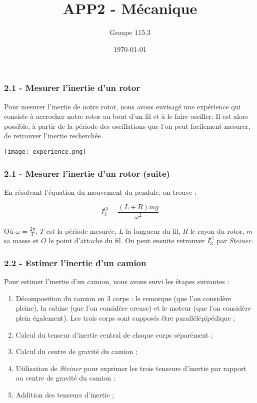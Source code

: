 \documentclass[pdf]{beamer}
\title{APP2 - Mécanique}
\author{Groupe 115.3}
\date{\today}
\begin{document}
\begin{frame}
	\titlepage
\end{frame}
\begin{frame}
	\frametitle{2.1 - Mesurer l'inertie d'un rotor}
	
	Pour mesurer l'inertie de notre rotor, nous avons envisagé une expérience
	qui consiste à accrocher notre rotor au bout d'un fil et à le faire osciller.
	Il est alors possible, à partir de la période des oscillations que l'on peut
	facilement mesurer, de retrouver l'inertie recherchée. 
	
	\begin{center}
		\texttt{[image: experience.png]}
	\end{center}
\end{frame}
\begin{frame}
	\frametitle{2.1 - Mesurer l'inertie d'un rotor (suite)}
	En résolvant l'équation du mouvement du pendule, on trouve :
	
	$$I^O_3 = \frac{(L+R)mg}{\omega^2}$$	
	
	Où $\omega = \frac{2\pi}{T}$, $T$ est la période mesurée, $L$ la longueur du fil, 
	$R$ le rayon du rotor, $m$ sa masse et $O$ le point d'attache du fil. On peut
	ensuite retrouver $I^G_3$ par \textit{Steiner}.
	
\end{frame}
\begin{frame}
	\frametitle{2.2 - Estimer l'inertie d'un camion}	

	Pour estimer l'inertie d'un camion, nous avons suivi les étapes suivantes :
	
	\begin{enumerate}
		\item Décomposition du camion en 3 corps : le remorque (que l'on considère
		pleine), la cabine (que l'on considère creuse) et le moteur (que l'on considère
		plein également). Les trois corps sont supposés être parallélépipédique ;
		\item Calcul du tenseur d'inertie central de chaque corps séparément ;
		\item Calcul du centre de gravité du camion ;
		\item Utilisation de \textit{Steiner} pour exprimer les trois tenseurs d'inertie
		par rapport au centre de gravité du camion :
		\item Addition des tenseurs d'inertie ;
	\end{enumerate}
\end{frame}
\end{document}
